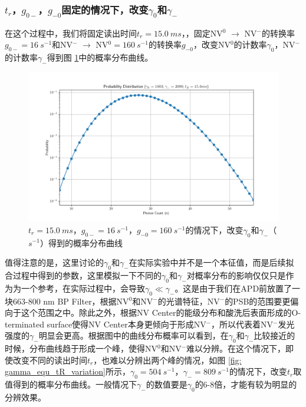 \documentclass[type = bachelor]{whu-thesis}
\begin{document}
\subsubsection{$t_r$，$g_{0-}$，$g_{-0}$固定的情况下，改变$\gamma_0$和$\gamma_-$}
在这个过程中，我们将固定读出时间$t_r = 15.0\ ms$，，固定NV$^0$ $\rightarrow$ NV$^-$的转换率$g_{0-} = 16\ s^{-1}$和NV$^-$ $\rightarrow$ NV$^0 = 160\ s^{-1}$的转换率$g_{-0}$，改变NV$^0$的计数率$\gamma_0$，NV$^-$的计数率$\gamma_-$得到图 \ref{fig: gamma_variation}中的概率分布曲线。
\begin{figure}
  \centering
  \includegraphics[width=1.0\textwidth]{figures/Chapter 5/gamma_variation.png}
  \caption[$t_r = 15.0\ ms$，$g_{0-} = 16\ s^{-1}$，$g_{-0} = 160\ s^{-1}$的情况下，改变$\gamma_0$和$\gamma_-$（$s^{-1}$）得到的概率分布曲线]{$t_r = 15.0\ ms$，$g_{0-} = 16\ s^{-1}$，$g_{-0} = 160\ s^{-1}$的情况下，改变$\gamma_0$和$\gamma_-$（$s^{-1}$）得到的概率分布曲线}
  \label{fig: gamma_variation}
\end{figure}
值得注意的是，这里讨论的$\gamma_0$和$\gamma_-$在实际实验中并不是一个本征值，而是后续拟合过程中得到的参数，这里模拟一下不同的$\gamma_0$和$\gamma_-$对概率分布的影响仅仅只是作为为一个参考，在实际过程中，会导致$\gamma_0\ll \gamma_-$。这是由于我们在APD前放置了一块663-800 nm BP Filter，根据NV$^0$和NV$^-$的光谱特征，NV$^-$的PSB的范围要更偏向于这个范围之中。除此之外，根据NV Center的能级分布和酸洗后表面形成的O-terminated surface使得NV Center本身更倾向于形成NV$^-$，所以代表着NV$^-$发光强度的$\gamma_-$明显会更高。根据图中的曲线分布概率可以看到，在$\gamma_0$和$\gamma_-$比较接近的时候，分布曲线趋于形成一个峰，使得NV$^0$和NV$^-$难以分辨。在这个情况下，即使改变不同的读出时间$t_r$，也难以分辨出两个峰的情况，如图 \ref{fig: gamma_equ_tR_variation}所示，$\gamma_0 = 504\ s^{-1}$，$\gamma_- = 809\ s^{-1}$的情况下，改变$t_r$取值得到的概率分布曲线。一般情况下$\gamma_-$的数值要是$\gamma_0$的6-8倍，才能有较为明显的分辨效果。
\end{document}
